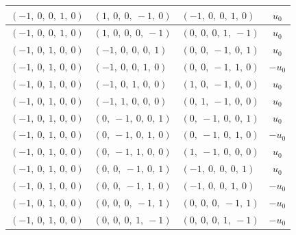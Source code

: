 \documentclass[11pt]{article}
\theoremstyle{definition}
\begin{document}
\begin{longtable}{|l|l|l|c|}
    \hline
    $\left( -1, \  0, \  0, \  1, \  0\right)$ & $\left( 1, \  0, \  0, \  -1, \  0\right)$ & $\left( -1, \  0, \  0, \  1, \  0\right)$ & $u_{0}$ \\
    \hline
    $\left( -1, \  0, \  0, \  1, \  0\right)$ & $\left( 1, \  0, \  0, \  0, \  -1\right)$ & $\left( 0, \  0, \  0, \  1, \  -1\right)$ & $u_{0}$ \\
    \hline
    $\left( -1, \  0, \  1, \  0, \  0\right)$ & $\left( -1, \  0, \  0, \  0, \  1\right)$ & $\left( 0, \  0, \  -1, \  0, \  1\right)$ & $u_{0}$ \\
    \hline
    $\left( -1, \  0, \  1, \  0, \  0\right)$ & $\left( -1, \  0, \  0, \  1, \  0\right)$ & $\left( 0, \  0, \  -1, \  1, \  0\right)$ & $- u_{0}$ \\
    \hline
    $\left( -1, \  0, \  1, \  0, \  0\right)$ & $\left( -1, \  0, \  1, \  0, \  0\right)$ & $\left( 1, \  0, \  -1, \  0, \  0\right)$ & $u_{0}$ \\
    \hline
    $\left( -1, \  0, \  1, \  0, \  0\right)$ & $\left( -1, \  1, \  0, \  0, \  0\right)$ & $\left( 0, \  1, \  -1, \  0, \  0\right)$ & $u_{0}$ \\
    \hline
    $\left( -1, \  0, \  1, \  0, \  0\right)$ & $\left( 0, \  -1, \  0, \  0, \  1\right)$ & $\left( 0, \  -1, \  0, \  0, \  1\right)$ & $u_{0}$ \\
    \hline
    $\left( -1, \  0, \  1, \  0, \  0\right)$ & $\left( 0, \  -1, \  0, \  1, \  0\right)$ & $\left( 0, \  -1, \  0, \  1, \  0\right)$ & $- u_{0}$ \\
    \hline
    $\left( -1, \  0, \  1, \  0, \  0\right)$ & $\left( 0, \  -1, \  1, \  0, \  0\right)$ & $\left( 1, \  -1, \  0, \  0, \  0\right)$ & $u_{0}$ \\
    \hline
    $\left( -1, \  0, \  1, \  0, \  0\right)$ & $\left( 0, \  0, \  -1, \  0, \  1\right)$ & $\left( -1, \  0, \  0, \  0, \  1\right)$ & $u_{0}$ \\
    \hline
    $\left( -1, \  0, \  1, \  0, \  0\right)$ & $\left( 0, \  0, \  -1, \  1, \  0\right)$ & $\left( -1, \  0, \  0, \  1, \  0\right)$ & $- u_{0}$ \\
    \hline
    $\left( -1, \  0, \  1, \  0, \  0\right)$ & $\left( 0, \  0, \  0, \  -1, \  1\right)$ & $\left( 0, \  0, \  0, \  -1, \  1\right)$ & $- u_{0}$ \\
    \hline
    $\left( -1, \  0, \  1, \  0, \  0\right)$ & $\left( 0, \  0, \  0, \  1, \  -1\right)$ & $\left( 0, \  0, \  0, \  1, \  -1\right)$ & $- u_{0}$ \\

\end{longtable}
\end{document}
